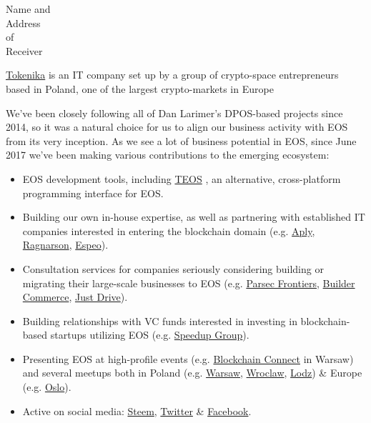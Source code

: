 \documentclass[a4paper,19pt]{letter}
\begin{document}
\begin{letter}{Name and \\ Address \\ of \\ Receiver}


\href{http://tokenika.io/}{Tokenika} is an IT company set up by a group of crypto-space entrepreneurs based in Poland, one of the largest crypto-markets in Europe

We've been closely following all of Dan Larimer's DPOS-based projects since 2014, so it was a natural choice for us to align our business activity with EOS from its very inception. As we see a lot of business potential in EOS, since June 2017 we've been making various contributions to the emerging ecosystem:

\begin{itemize}
\item EOS development tools, including \href{https://github.com/tokenika/teos}{TEOS} , an alternative, cross-platform programming interface for EOS.
\item Building our own in-house expertise, as well as partnering with established IT companies interested in entering the blockchain domain (e.g. \href{https://aply.eu/}{Aply}, \href{https://ragnarson.com/}{Ragnarson}, \href{http://espeo.eu/}{Espeo}).
\item Consultation services for companies seriously considering building or migrating their large-scale businesses to EOS (e.g. \href{http://parsecfrontiers.com/}{Parsec Frontiers}, \href{http://buildercommerce.com/}{Builder Commerce}, \href{http://justdrive.co/}{Just Drive}).
\item Building relationships with VC funds interested in investing in blockchain-based startups utilizing EOS (e.g. \href{http://speedupgroup.com/en/}{Speedup Group}).
\item Presenting EOS at high-profile events (e.g. \href{http://connectwarsaw.org/}{Blockchain Connect} in Warsaw) and several meetups both in Poland (e.g. \href{https://www.facebook.com/events/903326303125907/}{Warsaw}, \href{https://www.meetup.com/Wroclaw-Blockchain-Meetup/events/246349912/}{Wroclaw}, \href{https://www.facebook.com/events/160585741214328/}{Lodz}) \& Europe (e.g. \href{https://steemit.com/eos/@bitspace/bitspace-hosts-scandinavia-s-first-ever-eos-meetup-in-oslo-norway}{Oslo}).
\item Active on social media: \href{https://steemit.com/@tokenika}{Steem}, \href{https://twitter.com/tokenika_io}{Twitter} \& \href{https://www.facebook.com/groups/EOSPolska/}{Facebook}.
\end{itemize} 
 

\end{letter}
\end{document}
